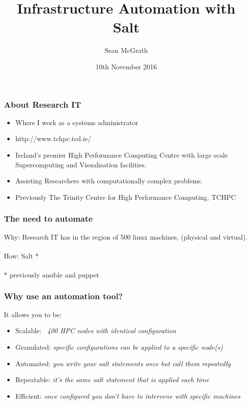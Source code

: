 \documentclass{beamer}
\title[]{Infrastructure Automation with Salt}
\author{Sean McGrath}
\institute[TCD]
{
Resarch IT \\
Trinity College Dublin \\
\medskip
\textit{sean.mcgrath@tcd.ie} 
}
\date{10th November 2016}
\begin{document}
\begin{frame}
\titlepage
\end{frame}





\begin{frame}
\frametitle{About Research IT}

\begin{itemize}
\item Where I work as a systems administrator
\item http://www.tchpc.tcd.ie/
\item Ireland's premier High Performance Computing Centre with large scale Supercomputing and Visualisation facilities.
\item Assisting Researchers with computationally complex problems.
\item Previously The Trinity Centre for High Performance Computing, TCHPC
\end{itemize}

\end{frame}

\begin{frame}
\frametitle{The need to automate}

Why: Research IT has in the region of 500 linux machines, (physical and virtual).\\~\\
How: Salt *\\~\\

* previously ansible and puppet

\end{frame}

\begin{frame}
\frametitle{Why use an automation tool?}

It allows you to be:
\begin{itemize}
\item Scalable: \emph{~400 HPC nodes with identical configuration}
\item Granulated: \emph{specific configurations can be applied to a specific node(s)}
\item Automated: \emph{you write your salt statements once but call them repeatedly}
\item Repeatable: \emph{it's the same salt statement that is applied each time}
\item Efficient: \emph{once configured you don't have to intervene with specific machines}
\end{itemize}
\end{frame}
\end{document}
